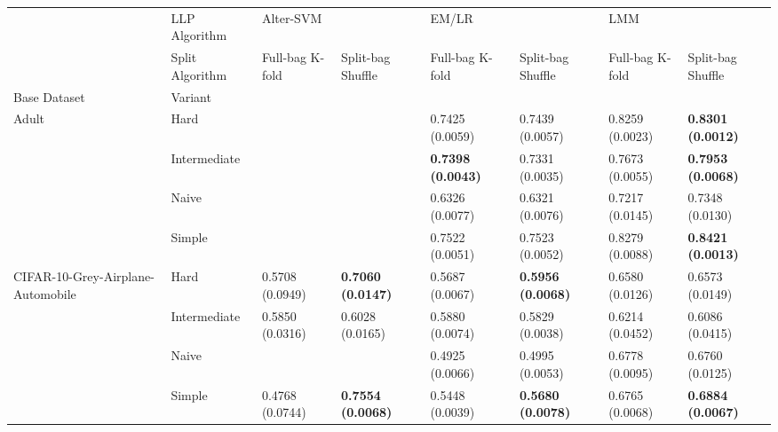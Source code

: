 \begin{tabular}{llllllll}
\toprule
                 & LLP Algorithm & \multicolumn{2}{l}{Alter-SVM} & \multicolumn{2}{l}{EM/LR} & \multicolumn{2}{l}{LMM} \\
                 & Split Algorithm &           Full-bag K-fold &         Split-bag Shuffle &           Full-bag K-fold &         Split-bag Shuffle &           Full-bag K-fold &         Split-bag Shuffle \\
Base Dataset & Variant &                           &                           &                           &                           &                           &                           \\
\midrule
Adult & Hard &                           &                           &           0.7425 (0.0059) &           0.7439 (0.0057) &           0.8259 (0.0023) &  \textbf{0.8301 (0.0012)} \\
                 & Intermediate &                           &                           &  \textbf{0.7398 (0.0043)} &           0.7331 (0.0035) &           0.7673 (0.0055) &  \textbf{0.7953 (0.0068)} \\
                 & Naive &                           &                           &           0.6326 (0.0077) &           0.6321 (0.0076) &           0.7217 (0.0145) &           0.7348 (0.0130) \\
                 & Simple &                           &                           &           0.7522 (0.0051) &           0.7523 (0.0052) &           0.8279 (0.0088) &  \textbf{0.8421 (0.0013)} \\
CIFAR-10-Grey-Airplane-Automobile & Hard &           0.5708 (0.0949) &  \textbf{0.7060 (0.0147)} &           0.5687 (0.0067) &  \textbf{0.5956 (0.0068)} &           0.6580 (0.0126) &           0.6573 (0.0149) \\
                 & Intermediate &           0.5850 (0.0316) &           0.6028 (0.0165) &           0.5880 (0.0074) &           0.5829 (0.0038) &           0.6214 (0.0452) &           0.6086 (0.0415) \\
                 & Naive &                           &                           &           0.4925 (0.0066) &           0.4995 (0.0053) &           0.6778 (0.0095) &           0.6760 (0.0125) \\
                 & Simple &           0.4768 (0.0744) &  \textbf{0.7554 (0.0068)} &           0.5448 (0.0039) &  \textbf{0.5680 (0.0078)} &           0.6765 (0.0068) &  \textbf{0.6884 (0.0067)} \\

\end{tabular}
